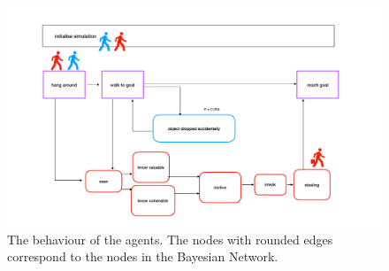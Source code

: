 \documentclass[11pt]{article}
\begin{document}
\begin{figure}[htbp]
\begin{center}
\includegraphics[width=\linewidth]{images/grotemarkt.pdf}
\end{center}
\caption{The behaviour of the agents. The nodes with rounded edges correspond to the nodes in the Bayesian Network.}
\label{behaviourGM}
\end{figure}
\end{document}

